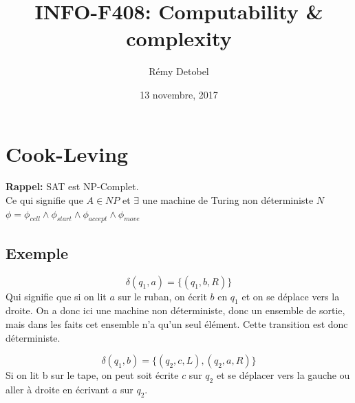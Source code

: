 \documentclass[a4paper,12pt]{article}
\title{INFO-F408: Computability \& complexity}
\date{13 novembre, 2017}
\author{Rémy Detobel}
\begin{document}
\maketitle
\newpage

\section{Cook-Leving}
  \textbf{Rappel:} SAT est NP-Complet.\\
  Ce qui signifie que $A \in NP$ et $\exists$ une machine de Turing non déterministe $N$\\
  $\phi = \phi_{cell} \wedge \phi_{start} \wedge \phi_{accept} \wedge \phi_{move}$

  \subsection{Exemple}
    $$\delta(q_1, a) = \{(q_1, b, R)\}$$
    Qui signifie que si on lit $a$ sur le ruban, on écrit $b$ en $q_1$ et on se déplace vers la droite. On a donc ici une machine non déterministe, donc un ensemble de sortie, mais dans les faits cet ensemble n'a qu'un seul élément. Cette transition est donc déterministe.

    $$\delta(q_1, b) = \{(q_2, c, L), (q_2, a, R)\}$$
    Si on lit b sur le tape, on peut soit écrite $c$ sur $q_2$ et se déplacer vers la gauche ou aller à droite en écrivant $a$ sur $q_2$.
\end{document}
